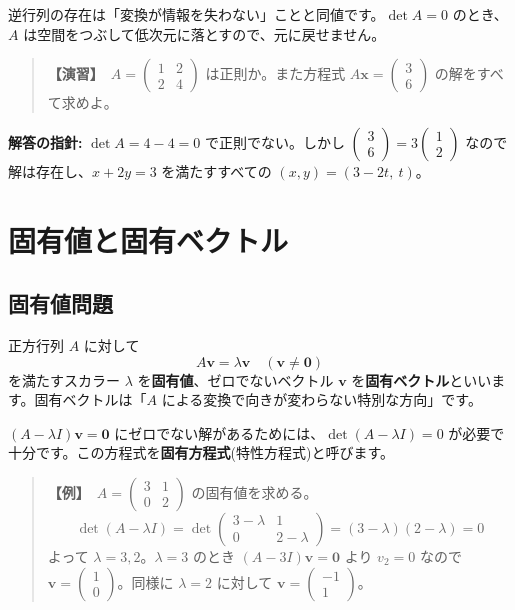 \documentclass{article}
\begin{document}
逆行列の存在は「変換が情報を失わない」ことと同値です。\(\det A = 0\) のとき、\(A\) は空間をつぶして低次元に落とすので、元に戻せません。

\begin{quote}
\textbf{【演習】}\ \(A = \begin{pmatrix} 1 & 2 \\ 2 & 4 \end{pmatrix}\) は正則か。また方程式 \(A\boldsymbol{x} = \begin{pmatrix} 3 \\ 6 \end{pmatrix}\) の解をすべて求めよ。
\end{quote}

\textbf{解答の指針:} \(\det A = 4 - 4 = 0\) で正則でない。しかし \(\begin{pmatrix} 3 \\ 6 \end{pmatrix} = 3 \begin{pmatrix} 1 \\ 2 \end{pmatrix}\) なので解は存在し、\(x + 2y = 3\) を満たすすべての \((x, y) = (3 - 2t,\ t)\)。

\section{固有値と固有ベクトル}

\subsection{固有値問題}

正方行列 \(A\) に対して
\[ A\boldsymbol{v} = \lambda \boldsymbol{v} \quad (\boldsymbol{v} \neq \boldsymbol{0}) \]
を満たすスカラー \(\lambda\) を\textbf{固有値}、ゼロでないベクトル \(\boldsymbol{v}\) を\textbf{固有ベクトル}といいます。固有ベクトルは「\(A\) による変換で向きが変わらない特別な方向」です。

\((A - \lambda I)\boldsymbol{v} = \boldsymbol{0}\) にゼロでない解があるためには、\(\det(A - \lambda I) = 0\) が必要で十分です。この方程式を\textbf{固有方程式}(特性方程式)と呼びます。

\begin{quote}
\textbf{【例】}\ \(A = \begin{pmatrix} 3 & 1 \\ 0 & 2 \end{pmatrix}\) の固有値を求める。
\[ \det(A - \lambda I) = \det \begin{pmatrix} 3 - \lambda & 1 \\ 0 & 2 - \lambda \end{pmatrix} = (3 - \lambda)(2 - \lambda) = 0 \]
よって \(\lambda = 3, 2\)。\(\lambda = 3\) のとき \((A - 3I)\boldsymbol{v} = \boldsymbol{0}\) より \(v_2 = 0\) なので \(\boldsymbol{v} = \begin{pmatrix} 1 \\ 0 \end{pmatrix}\)。同様に \(\lambda = 2\) に対して \(\boldsymbol{v} = \begin{pmatrix} -1 \\ 1 \end{pmatrix}\)。
\end{quote}
\end{document}
